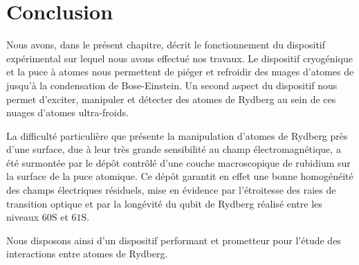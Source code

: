 \section*{Conclusion}
\noindent Nous avons, dans le présent chapitre, décrit le fonctionnement du dispositif expérimental sur lequel nous avons effectué nos travaux.
Le dispositif cryogénique et la puce à atomes nous permettent de piéger et refroidir des nuages d'atomes de  jusqu'à la condensation de Bose-Einstein.
Un second aspect du dispositif nous permet d'exciter, manipuler et détecter des atomes de Rydberg au sein de ces nuages d'atomes ultra-froids.

La difficulté particulière que présente la manipulation d'atomes de Rydberg près d'une surface, due à leur très grande sensibilité au champ électromagnétique, a été surmontée par le dépôt contrôlé d'une couche macroscopique de rubidium sur la surface de la puce atomique.
Ce dépôt garantit en effet une bonne homogénéité des champs électriques résiduels, mise en évidence par l'étroitesse des raies de transition optique et par la longévité du qubit de Rydberg réalisé entre les niveaux $\mathrm{60S}$ et $\mathrm{61S}$.

Nous disposons ainsi 
d'un dispositif performant et prometteur pour l'étude des interactions entre atomes de Rydberg.
